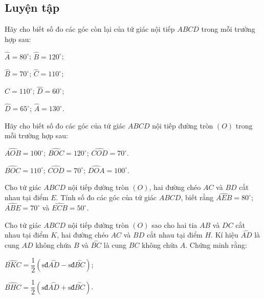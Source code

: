 \begin{practice}
    \subsection{Luyện tập}

    \begin{questions}[resume=SBT]
        \item Hãy cho biết số đo các góc còn lại của tứ giác nội tiếp $ABCD$ trong mỗi trường hợp sau:
        \begin{questions}
            \item $\widehat A=80^\circ$; $\widehat B=120^\circ$;
            \item $\widehat B=70^\circ$; $\widehat C=110^\circ$;
            \item $\widehat C=110^\circ$; $\widehat D=60^\circ$;
            \item $\widehat D=65^\circ$; $\widehat A=130^\circ$.
        \end{questions}

        \answerline
        \answerline

        \item Hãy cho biết số đo các góc của tứ giác $ABCD$ nội tiếp đường tròn $(O)$ trong mỗi trường hợp sau:
        \begin{questions}
            \item $\widehat{AOB}=100^\circ$; $\widehat{BOC}=120^\circ$; $\widehat{COD}=70^\circ$.
            \item $\widehat{BOC}=110^\circ$; $\widehat{COD}=70^\circ$; $\widehat{DOA}=100^\circ$.
        \end{questions}

        \answerline
        \answerline
        \answerline

        \item Cho tứ giác $ABCD$ nội tiếp đường tròn $(O)$, hai đường chéo $AC$ và $BD$ cắt nhau tại điểm $E$. Tính số đo các góc của tứ giác $ABCD$, biết rằng $\widehat{AEB}=80^\circ$; $\widehat{ABE}=70^\circ$ và $\widehat{ECB}=50^\circ$.

        \answerline
        \answerline
        \answerline

        \item Cho tứ giác $ABCD$ nội tiếp đường tròn $(O)$ sao cho hai tia $AB$ và $DC$ cắt nhau tại điểm $K$, hai đường chéo $AC$ và $BD$ cắt nhau tại điểm $H$. Kí hiệu $\overset{\frown}{AD}$ là cung $AD$ không chứa $B$ và $\overset{\frown}{BC}$ là cung $BC$ không chứa $A$. Chứng minh rằng:
        \begin{questions}
            \item $\widehat{BKC}=\dfrac12\left(\text{sđ}\overset{\frown}{AD}-\text{sđ}\overset{\frown}{BC}\right)$;
            \item $\widehat{BHC}=\dfrac12\left(\text{sđ}\overset{\frown}{AD}+\text{sđ}\overset{\frown}{BC}\right)$.
        \end{questions}


\end{questions}
\end{practice}
